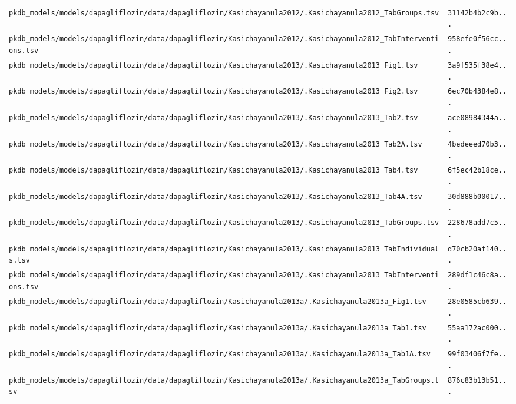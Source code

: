 \documentclass{article}
\begin{document}
\begin{longtable}{ll}
\texttt{pkdb\_models/models/dapagliflozin/data/dapagliflozin/Kasichayanula2012/.Kasichayanula2012\_TabGroups.tsv} & \texttt{31142b4b2c9b...} \\
\texttt{pkdb\_models/models/dapagliflozin/data/dapagliflozin/Kasichayanula2012/.Kasichayanula2012\_TabInterventions.tsv} & \texttt{958efe0f56cc...} \\
\texttt{pkdb\_models/models/dapagliflozin/data/dapagliflozin/Kasichayanula2013/.Kasichayanula2013\_Fig1.tsv} & \texttt{3a9f535f38e4...} \\
\texttt{pkdb\_models/models/dapagliflozin/data/dapagliflozin/Kasichayanula2013/.Kasichayanula2013\_Fig2.tsv} & \texttt{6ec70b4384e8...} \\
\texttt{pkdb\_models/models/dapagliflozin/data/dapagliflozin/Kasichayanula2013/.Kasichayanula2013\_Tab2.tsv} & \texttt{ace08984344a...} \\
\texttt{pkdb\_models/models/dapagliflozin/data/dapagliflozin/Kasichayanula2013/.Kasichayanula2013\_Tab2A.tsv} & \texttt{4bedeeed70b3...} \\
\texttt{pkdb\_models/models/dapagliflozin/data/dapagliflozin/Kasichayanula2013/.Kasichayanula2013\_Tab4.tsv} & \texttt{6f5ec42b18ce...} \\
\texttt{pkdb\_models/models/dapagliflozin/data/dapagliflozin/Kasichayanula2013/.Kasichayanula2013\_Tab4A.tsv} & \texttt{30d888b00017...} \\
\texttt{pkdb\_models/models/dapagliflozin/data/dapagliflozin/Kasichayanula2013/.Kasichayanula2013\_TabGroups.tsv} & \texttt{228678add7c5...} \\
\texttt{pkdb\_models/models/dapagliflozin/data/dapagliflozin/Kasichayanula2013/.Kasichayanula2013\_TabIndividuals.tsv} & \texttt{d70cb20af140...} \\
\texttt{pkdb\_models/models/dapagliflozin/data/dapagliflozin/Kasichayanula2013/.Kasichayanula2013\_TabInterventions.tsv} & \texttt{289df1c46c8a...} \\
\texttt{pkdb\_models/models/dapagliflozin/data/dapagliflozin/Kasichayanula2013a/.Kasichayanula2013a\_Fig1.tsv} & \texttt{28e0585cb639...} \\
\texttt{pkdb\_models/models/dapagliflozin/data/dapagliflozin/Kasichayanula2013a/.Kasichayanula2013a\_Tab1.tsv} & \texttt{55aa172ac000...} \\
\texttt{pkdb\_models/models/dapagliflozin/data/dapagliflozin/Kasichayanula2013a/.Kasichayanula2013a\_Tab1A.tsv} & \texttt{99f03406f7fe...} \\
\texttt{pkdb\_models/models/dapagliflozin/data/dapagliflozin/Kasichayanula2013a/.Kasichayanula2013a\_TabGroups.tsv} & \texttt{876c83b13b51...} \\

\end{longtable}
\end{document}
